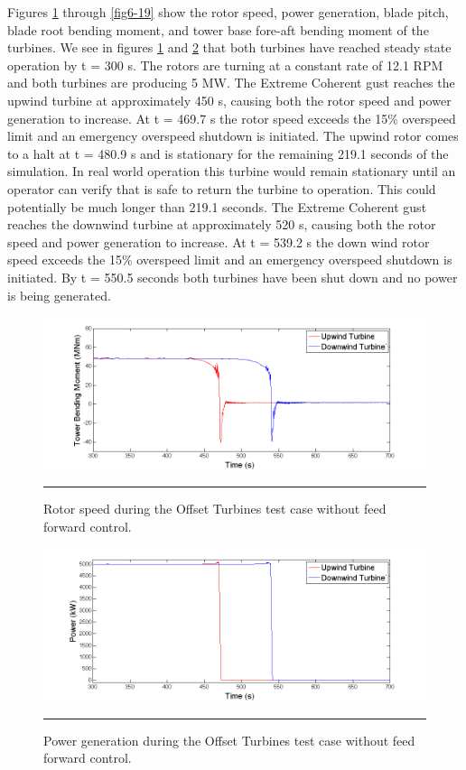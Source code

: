 Figures \ref{fig6-15} through \ref{fig6-19} show the rotor speed, power generation, blade pitch, blade root bending moment, and tower base fore-aft bending moment of the turbines. We see in figures \ref{fig6-15} and \ref{fig6-16} that both turbines have reached steady state operation by t = 300 s. The rotors are turning at a constant rate of 12.1 RPM and both turbines are producing 5 MW. The Extreme Coherent gust reaches the upwind turbine at approximately 450 s, causing both the rotor speed and power generation to increase. At t = 469.7 s the rotor speed exceeds the 15\% overspeed limit and an emergency overspeed shutdown is initiated. The upwind rotor comes to a halt at t = 480.9 s and is stationary for the remaining 219.1 seconds of the simulation. In real world operation this turbine would remain stationary until an operator can verify that is safe to return the turbine to operation. This could potentially be much longer than 219.1 seconds. The Extreme Coherent gust reaches the downwind turbine at approximately 520 s, causing both the rotor speed and power generation to increase. At t = 539.2 s the down wind rotor speed exceeds the 15\% overspeed limit and an emergency overspeed shutdown is initiated. By t = 550.5 seconds both turbines have been shut down and no power is being generated.

\begin{figure}[htbp] \label{fig6-15}
	\centering
		\includegraphics[trim = {1cm 0 2cm 0}, clip, width = \linewidth]{Figures/ch6Figures/fig6-15.png}
		\rule{35em}{0.5pt}
	\caption{Rotor speed during the Offset Turbines test case without feed forward control.}
\end{figure}
\begin{figure}[htbp] \label{fig6-16}
	\centering
		\includegraphics[trim = {1cm 0 2cm 0}, clip, width = \linewidth]{Figures/ch6Figures/fig6-16.png}
		\rule{35em}{0.5pt}
	\caption{Power generation during the Offset Turbines test case without feed forward control.}
\end{figure}

